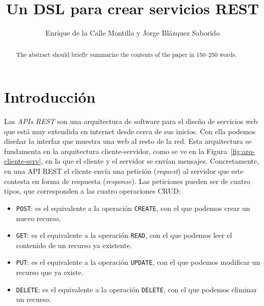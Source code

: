 \documentclass[runningheads]{llncs}
\begin{document}
\title{Un DSL para crear servicios REST}

\author{Enrique de la Calle Montilla y
Jorge Blázquez Saborido}

\maketitle

\begin{abstract}
The abstract should briefly summarize the contents of the paper in
150--250 words.

\end{abstract}

\section{Introducción}


Las \emph{APIs REST} son una arquitectura de software para el diseño
de servicios web que está muy extendida en internet desde cerca de
sus inicios. Con ella podemos diseñar la interfaz que muestra una web
al resto de la red. Esta arquitectura se fundamenta en la arquitectura
cliente-servidor, como se ve en la Figura~\ref{fig:arq-cliente-serv},
en la que el cliente y el servidor se envían mensajes. Concretamente,
en una API REST el cliente envía una petición (\emph{request}) al
servidor que este contesta en forma de respuesta (\emph{response}). Las
peticiones pueden ser de cuatro tipos, que corresponden a las
cuatro operaciones CRUD:

\newcommand\POST{\texttt{POST}}
\newcommand\GET{\texttt{GET}}
\newcommand\PUT{\texttt{PUT}}
\newcommand\DELETE{\texttt{DELETE}}

\newcommand\CREATE{\texttt{CREATE}}
\newcommand\READ{\texttt{READ}}
\newcommand\UPDATE{\texttt{UPDATE}}

\begin{itemize}
    \item \POST: es el equivalente a la operación \CREATE, con el que podemos
        crear un nuevo recurso.
    \item \GET: es el equivalente a la operación \READ, con el que podemos
        leer el contenido de un recurso ya existente.
    \item \PUT: es el equivalente a la operación \UPDATE, con el que podemos
        modificar un recurso que ya existe.
    \item \DELETE: es el equivalente a la operación \DELETE, con el que podemos
        eliminar un recurso.
\end{itemize}
\end{document}
